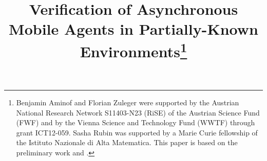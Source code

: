 \def\dir{\textrm{Dir}}
\def\go{\textsf{go}}
\def\deg{\textsf{deg}}
\def\collide{\textsf{collide}}

\def\ins{\textsc{gc}}
\def\mem{\mathbf{mem}}
\def\exit{\mathbf{move}}
\def\update{\mathbf{update}}

\def\Bij{\textrm{Bij}(\Delta)}

\newcommand{\fire}{\mathsf{fire}}
\newcommand{\extfire}{\mathsf{FIRE}}


\newcommand{\Kstep}{\mathsf{step}^K}

\newcommand{\step}{\mathsf{step}}

\newcommand{\robot}{\mathsf{robot}}

\newcommand{\steps}{\mathsf{steps}}
\newcommand{\pub}{\mathsf{pub}}
\newcommand{\visited}{\mathsf{visited}}
\newcommand{\extsteps}{\mathsf{STEPS}}
\newcommand{\extpub}{\mathsf{PUB}}



\newcommand{\segment}{\mathsf{segment}}

\newcommand{\mover}{\ensuremath{Mvr}}
\newcommand{\round}{\ensuremath{R}}
\newcommand{\helper}{\ensuremath{\round^\prime}}
\newcommand{\zero}{\ensuremath{Z}}
\newcommand{\zeroTest}{\ensuremath{T}}
\newcommand{\counter}{\ensuremath{C}}

\newcommand{\courcellian}{Courcellian }


\newcommand{\runs}{\mathsf{Runs}}


\def\bcpos{pub\_pos}
\def\bcst{pub\_st}
\def\bcPOS{pub\_POS}
\def\bcST{pub\_ST}

\def\VARbcpos{\mathsf{pub\_pos}}
\def\VARpos{\mathsf{pos}}
\def\VARBCPOS{\mathsf{pub\_POS}}

\def\VARpubst{\mathsf{pub\_st}}


 \newcommand{\onestep}[3]{#1 \stackrel{{#3}}{\rightarrowtail} #2}

\newcommand{\gc}[2]{#1:#2}


\newcommand{\limp}{\rightarrow}

\newcommand{\activeproj}{active}




\title{Verification of Asynchronous Mobile Agents in Partially-Known Environments\thanks{Benjamin Aminof and Florian Zuleger were supported by the Austrian National Research Network S11403-N23 (RiSE) of the Austrian Science Fund (FWF) and by the Vienna Science and Technology Fund (WWTF) through grant ICT12-059.  Sasha Rubin was supported by a Marie Curie 
fellowship of the Istituto Nazionale di Alta Matematica. This paper is based on the preliminary work \cite{Rubin15AAMAS} and \cite{RZMA15}.}}

